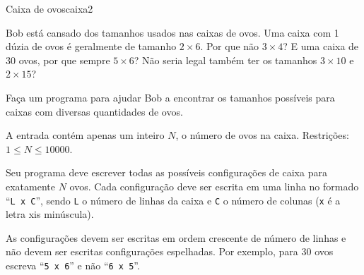 \documentclass[12pt,a4paper,oneside]{article}
\begin{document}
\begin{problem}{Caixa de ovos}{caixa}{2}
 
Bob está cansado dos tamanhos usados nas caixas de ovos. Uma caixa com 1 dúzia de ovos é geralmente de tamanho $2 \times 6$. Por que não $3 \times 4$? E uma caixa de 30 ovos, por que sempre $5 \times 6$? Não seria legal também ter os tamanhos $3 \times 10$ e $2 \times 15$?

Faça um programa para ajudar Bob a encontrar os tamanhos possíveis para caixas com diversas quantidades de ovos.

%

\InputFile

A entrada contém apenas um inteiro $N$, o número de ovos na caixa. Restrições: $1 \leq N \leq 10000$.


\OutputFile

Seu programa deve escrever todas as possíveis configurações de caixa para exatamente $N$ ovos. Cada configuração deve ser escrita em uma linha no formado ``\texttt{L x C}'', sendo \texttt{L} o número de linhas da caixa e \texttt{C} o número de colunas (\texttt{x} é a letra xis minúscula).

\Notes
As configurações devem ser escritas em ordem crescente de número de linhas e não devem ser escritas configurações espelhadas. Por exemplo, para 30 ovos escreva ``\texttt{5 x 6}'' e não ``\texttt{6 x 5}''.

\Example

\begin{example}
%
\end{example}

\begin{example}
%
\end{example}

\begin{example}
%
\end{example}

\begin{example}
%
\end{example}



\end{problem}
\end{document}
